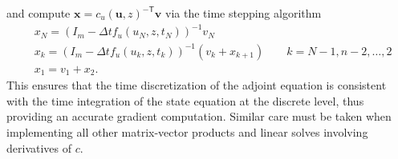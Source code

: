 \documentclass{article}
\renewcommand{\vec}[1] {\ensuremath{\boldsymbol{#1}}}
\def\u{{\vec{u}}}
\def\x{{\vec{x}}}
\def\v{{\vec{v}}}
\newcommand{\invtrp}{^{-\mathsf{T}}}
\begin{document}
and compute $\x=c_u(\u,z)\invtrp \v$ via the time stepping algorithm
\begin{align*}
& x_N = (I_m - \Delta t f_u(u_N,z,t_N))^{-1} v_N \\
& x_k = (I_m - \Delta t f_u(u_k,z,t_k))^{-1} (v_k + x_{k+1}) \qquad k=N-1,n-2,\dots,2 \\
& x_1 = v_1 + x_2 .
\end{align*}
This ensures that the time discretization of the adjoint equation is consistent with the time integration of the state equation at the discrete level, thus providing an accurate gradient computation. Similar care must be taken when implementing all other matrix-vector products and linear solves involving derivatives of $c$.
\end{document}
